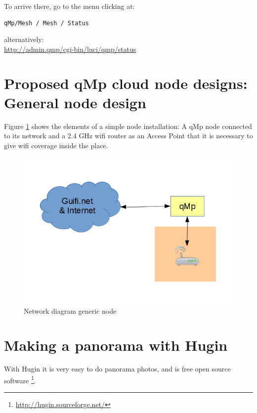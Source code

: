 \documentclass[11pt]{article}
\begin{document}
\noindent
To arrive there, go to the menu clicking at:
\begin{verbatim}
qMp/Mesh / Mesh / Status
\end{verbatim}
alternatively:\\
\url{http://admin.qmp/cgi-bin/luci/qmp/status}
\section{Proposed qMp cloud node designs: General node design}
\label{sec-9}
Figure \ref{fig:gen-node} shows the elements of a simple node installation:
A qMp node connected to its network and a 2.4 GHz wifi router as an
Access Point that it is necessary to give wifi coverage inside the
place.
\begin{figure}[htb]
\centering
\includegraphics[width=.9\linewidth]{./img/mesh-designs/generic_node.png}
\caption{\label{fig:gen-node}Network diagram generic node}
\end{figure}
\section{Making a panorama with Hugin}
\label{sec-10}
With Hugin it is very easy to do panorama photos, and is free open
source software \footnote{\url{http://hugin.sourceforge.net/}}.
\end{document}
